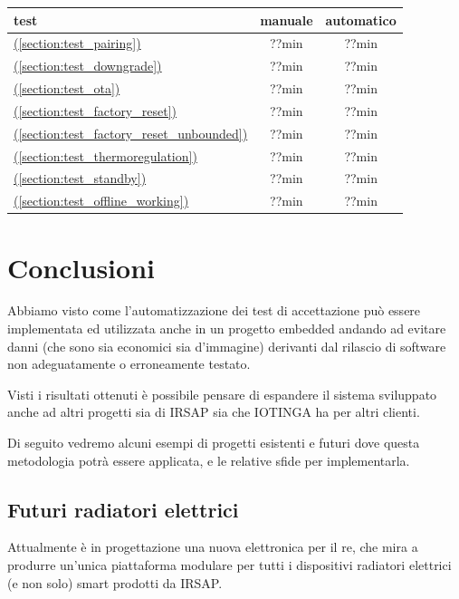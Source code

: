 \documentclass[12pt,a4paper,twoside,titlepage]{book}
\newcommand*{\fullref}[1]{\hyperref[{#1}]{\nameref*{#1} (\ref*{#1})}}
\begin{document}
\begin{center}
\begin{tabular}{| l | c | c |}
    \hline
    \textbf{test} & \textbf{manuale} & \textbf{automatico} \\ \hline
    \fullref{section:test_pairing} & ??min & ??min \\ \hline
    \fullref{section:test_downgrade} & ??min & ??min \\ \hline
    \fullref{section:test_ota} & ??min & ??min \\ \hline
    \fullref{section:test_factory_reset} & ??min & ??min \\ \hline
    \fullref{section:test_factory_reset_unbounded} & ??min & ??min \\ \hline 
    \fullref{section:test_thermoregulation} & ??min & ??min \\ \hline 
    \fullref{section:test_standby} & ??min & ??min \\ \hline 
    \fullref{section:test_offline_working} & ??min & ??min \\ \hline 
\end{tabular}
\end{center}

\chapter{Conclusioni}

Abbiamo visto come l'automatizzazione dei test di accettazione può essere implementata
ed utilizzata anche in un progetto embedded andando ad evitare danni (che sono sia economici
sia d'immagine) derivanti dal rilascio di software non adeguatamente o erroneamente testato.

Visti i risultati ottenuti è possibile pensare di espandere il sistema sviluppato
anche ad altri progetti sia di IRSAP sia che IOTINGA ha per altri clienti.

Di seguito vedremo alcuni esempi di progetti esistenti e futuri dove questa metodologia
potrà essere applicata, e le relative sfide per implementarla.

\section{Futuri radiatori elettrici}

Attualmente è in progettazione una nuova elettronica per il \Gls{re},
che mira a produrre un'unica piattaforma modulare per tutti i dispositivi radiatori elettrici
(e non solo) smart prodotti da IRSAP.
\end{document}
